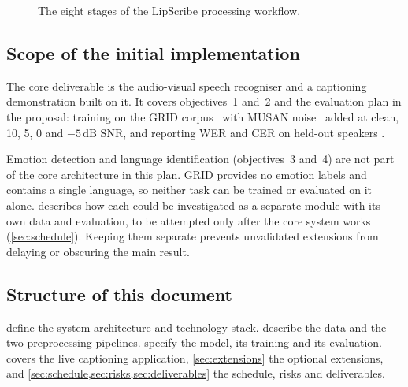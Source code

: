 \begin{figure}[H]
\centering
{}
\caption{The eight stages of the LipScribe processing workflow.}
\label{fig:workflow}
\end{figure}

\subsection{Scope of the initial implementation}
The core deliverable is the audio-visual speech recogniser and a captioning
demonstration built on it. It covers objectives~1 and~2 and the evaluation
plan in the proposal: training on the GRID corpus~\cite{cooke2006} with
MUSAN noise~\cite{snyder2015} added at clean, 10, 5, 0 and $-5$\,dB SNR, and
reporting WER and CER on held-out speakers \spec.

Emotion detection and language identification (objectives~3 and~4) are not
part of the core architecture in this plan. GRID provides no emotion labels
and contains a single language, so neither task can be trained or evaluated
on it alone.  describes how each could be investigated as
a separate module with its own data and evaluation, to be attempted only after
the core system works (\cref{sec:schedule}). Keeping them separate prevents
unvalidated extensions from delaying or obscuring the main result.

\subsection{Structure of this document}
 define the system architecture and
technology stack.  describe the data
and the two preprocessing pipelines. 
specify the model, its training and its evaluation. 
covers the live captioning application, \cref{sec:extensions} the optional
extensions, and \cref{sec:schedule,sec:risks,sec:deliverables} the schedule,
risks and deliverables.

